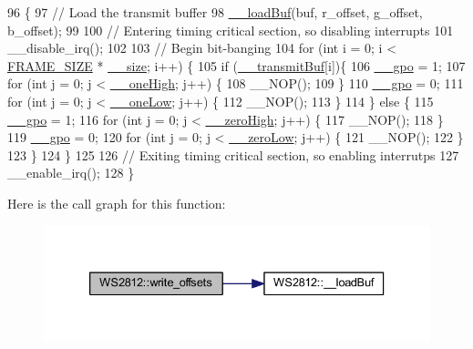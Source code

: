 \begin{DoxyCode}
96                                                                               \{
97     \textcolor{comment}{// Load the transmit buffer}
98     \hyperlink{class_w_s2812_adfe7d119deac16639f987130f5db724e}{\_\_loadBuf}(buf, r\_offset, g\_offset, b\_offset);
99 
100     \textcolor{comment}{// Entering timing critical section, so disabling interrupts}
101     \_\_disable\_irq();
102 
103     \textcolor{comment}{// Begin bit-banging}
104     \textcolor{keywordflow}{for} (\textcolor{keywordtype}{int} i = 0; i < \hyperlink{_w_s2812_8h_af9b1b2ba12857a4bf11289dac8c5462d}{FRAME\_SIZE} * \hyperlink{class_w_s2812_a5623ee0fd628d54483c0427f30f4d568}{\_\_size}; i++) \{
105         \textcolor{keywordflow}{if} (\hyperlink{class_w_s2812_a345b0895fb037ed603a79806bb7e510c}{\_\_transmitBuf}[i])\{
106             \hyperlink{class_w_s2812_a37c5f3871012186c92a1bf856ca888ee}{\_\_gpo} = 1;
107             \textcolor{keywordflow}{for} (\textcolor{keywordtype}{int} j = 0; j < \hyperlink{class_w_s2812_acef8597fa4d4a31916a1460de124026e}{\_\_oneHigh}; j++) \{
108                 \_\_NOP();
109             \}
110             \hyperlink{class_w_s2812_a37c5f3871012186c92a1bf856ca888ee}{\_\_gpo} = 0;
111             \textcolor{keywordflow}{for} (\textcolor{keywordtype}{int} j = 0; j < \hyperlink{class_w_s2812_ab6d118fa4ae51618675d284fc7130fdd}{\_\_oneLow}; j++) \{
112                 \_\_NOP();
113             \}
114         \} \textcolor{keywordflow}{else} \{
115             \hyperlink{class_w_s2812_a37c5f3871012186c92a1bf856ca888ee}{\_\_gpo} = 1;
116             \textcolor{keywordflow}{for} (\textcolor{keywordtype}{int} j = 0; j < \hyperlink{class_w_s2812_a44dea9eca691fddccd0637af24c028d8}{\_\_zeroHigh}; j++) \{
117                 \_\_NOP();
118             \}
119             \hyperlink{class_w_s2812_a37c5f3871012186c92a1bf856ca888ee}{\_\_gpo} = 0;
120             \textcolor{keywordflow}{for} (\textcolor{keywordtype}{int} j = 0; j < \hyperlink{class_w_s2812_addde539bd94ea4a670420c22cace2216}{\_\_zeroLow}; j++) \{
121                 \_\_NOP();
122             \}
123         \}
124     \}
125 
126     \textcolor{comment}{// Exiting timing critical section, so enabling interrutps}
127     \_\_enable\_irq();
128 \}
\end{DoxyCode}
Here is the call graph for this function\+:\nopagebreak
\begin{figure}[H]
\begin{center}
\leavevmode
\includegraphics[width=333pt]{class_w_s2812_a578fd0b278445bd6f84e260a69b18a68_cgraph}
\end{center}
\end{figure}
